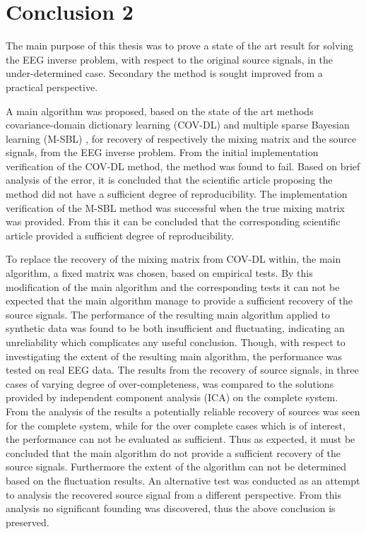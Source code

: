 \chapter{Conclusion 2}
The main purpose of this thesis was to prove a state of the art result for solving the EEG inverse problem, with respect to the original source signals, in the under-determined case.
Secondary the method is sought improved from a practical perspective.

A main algorithm was proposed, based on the state of the art methods covariance-domain dictionary learning (COV-DL) \cite{Balkan2015} and multiple sparse Bayesian learning (M-SBL) \cite{Balkan2014}, for recovery of respectively the mixing matrix and the source signals, from the EEG inverse problem. 
From the initial implementation verification of the COV-DL method, the method was found to fail. Based on brief analysis of the error, it is concluded that the scientific article proposing the method did not have a sufficient degree of reproducibility.    
The implementation verification of the M-SBL method was successful when the true mixing matrix was provided. From this it can be concluded that the corresponding scientific article provided a sufficient degree of reproducibility.  

To replace the recovery of the mixing matrix from COV-DL within, the main algorithm, a fixed matrix was chosen, based on empirical tests.
By this modification of the main algorithm and the corresponding tests it can not be expected that the main algorithm manage to provide a sufficient recovery of the source signals. The performance of the resulting main algorithm applied to synthetic data was found to be both insufficient and fluctuating, indicating an unreliability which complicates any useful conclusion.      
Though, with respect to investigating the extent of the resulting main algorithm, the performance was tested on real EEG data. 
The results from the recovery of source signals, in three cases of varying degree of over-completeness, was compared to the solutions provided by independent component analysis (ICA) on the complete system. From the analysis of the results a potentially reliable recovery of sources was seen for the complete system, while for the over complete cases which is of interest, the performance can not be evaluated as sufficient. Thus as expected, it must be concluded that the main algorithm do not provide a sufficient recovery of the source signals. Furthermore the extent of the algorithm can not be determined based on the fluctuation results. 
An alternative test was conducted as an attempt to analysis the recovered source signal from a different perspective. From this analysis no significant founding was discovered, thus the above conclusion is preserved. 

